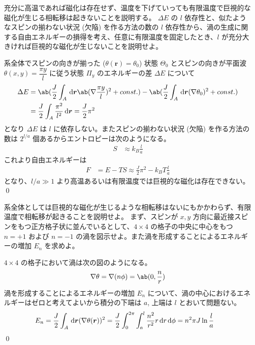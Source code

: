 \documentclass[uplatex,dvipdfmx,a4paper,11pt]{jlreq}
\makeatletter
\newcommand{\rr}{\bm{r}}
\newcommand{\vnabla}{\mathbf{\nabla}}
\numberwithin{equation}{section}
\theoremstyle{definition}
\renewenvironment{proof}[1][\proofname]{\par
  \normalfont
  \topsep6\p@\@plus6\p@ \trivlist
  \item[\hskip\labelsep{\bfseries #1}\@addpunct{\bfseries}]\ignorespaces\quad\par
}{%
  \qed\endtrivlist\@endpefalse
}
\renewcommand\proofname{証明}
\makeatother
\begin{document}
\begin{problem}
充分に高温であれば磁化は存在せず、温度を下げていっても有限温度で巨視的な磁化が生じる相転移は起きないことを説明する。
$\Delta E$ の $l$ 依存性と、似たようなスピンの揃わない状況 (欠陥) を作る方法の数の $l$ 依存性から、渦の生成に関する自由エネルギーの損得を考え、任意に有限温度を固定したとき、$l$ が充分大きければ巨視的な磁化が生じないことを説明せよ。
\end{problem}
\begin{proof}
  系全体でスピンの向きが揃った ($\theta(\rr) = \theta_0$) 状態 $\Theta_0$ とスピンの向きが平面波 $\theta(x, y) = \dfrac{\pi y}{l}$ に従う状態 $\Pi_y$ のエネルギーの差 $\Delta E$ について
  \begin{align}
    \Delta E & = \ab(\frac{J}{2}\int_A\dl{\rr} \ab(\vnabla\frac{\pi y}{l})^2 + const.) - \ab(\frac{J}{2}\int_A\dl{\rr} (\vnabla\theta_0)^2 + const.) \\
             & = \frac{J}{2}\int_A\frac{\pi^2}{l^2}\dl{\rr} = \frac{J}{2}\pi^2
  \end{align}
  となり $\Delta E$ は $l$ に依存しない。またスピンの揃わない状況 (欠陥) を作る方法の数は $2^{l/a}$ 個あるからエントロピーは次のようになる。
  \begin{align}
    S & \approx k_B\frac{l}{a}
  \end{align}
  これより自由エネルギーは
  \begin{align}
    F & = E - TS \approx \frac{J}{2}\pi^2 - k_BT\frac{l}{a}
  \end{align}
  となり、$l/a \gg 1$ より高温あるいは有限温度では巨視的な磁化は存在できない。
\end{proof}

\begin{problem}
系全体としては巨視的な磁化が生じるような相転移はないにもかかわらず、有限温度で相転移が起きることを説明せよ。
まず、スピンが $x, y$ 方向に最近接スピンをもつ正方格子状に並んでいるとして、$4 \times 4$ の格子の中央に中心をもつ $n = +1$ および $n = -1$ の渦を図示せよ。また渦を形成することによるエネルギーの増加 $E_n$ を求めよ。
\end{problem}
\begin{proof}
  $4 \times 4$ の格子において渦は次の図のようになる。
  \begin{align}
    \vnabla\theta = \vnabla(n\phi) = \ab(0, \frac{n}{r})
  \end{align}
  渦を形成することによるエネルギーの増加 $E_n$ について、渦の中心におけるエネルギーはゼロと考えてよいから積分の下端は $a$, 上端は $l$ とおいて問題ない。
  \begin{align}
    E_n & = \frac{J}{2}\int_A\dl{\rr} (\vnabla\theta(\rr))^2 = \frac{J}{2}\int_0^{2\pi}\int_a^l\frac{n^2}{r^2}r\dl{r}\dl{\phi} = n^2\pi J\ln\frac{l}{a}
  \end{align}
\end{proof}
\end{document}
